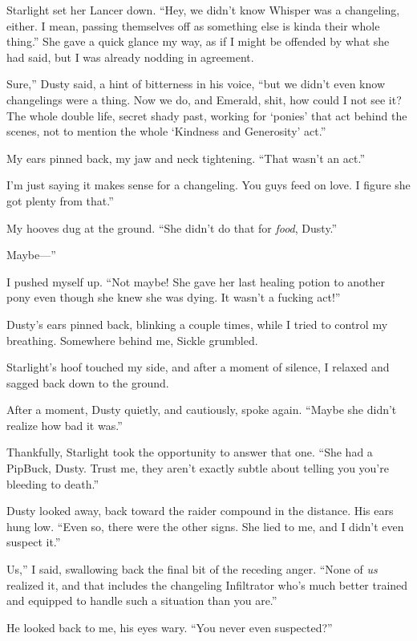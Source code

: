 Starlight set her Lancer down. “Hey, we didn’t know Whisper was a changeling, either. I mean, passing themselves off as something else is kinda their whole thing.” She gave a quick glance my way, as if I might be offended by what she had said, but I was already nodding in agreement.

\leavevmode{}Sure,” Dusty said, a hint of bitterness in his voice, “but we didn’t even know changelings were a thing. Now we do, and Emerald, shit, how could I not see it? The whole double life, secret shady past, working for ‘ponies’ that act behind the scenes, not to mention the whole ‘Kindness and Generosity’ act.”

My ears pinned back, my jaw and neck tightening. “That wasn’t an act.”

\leavevmode{}I’m just saying it makes sense for a changeling. You guys feed on love. I figure she got plenty from that.”

My hooves dug at the ground. “She didn’t do that for \textit{food}, Dusty.”

\leavevmode{}Maybe—”

I pushed myself up. “Not maybe! She gave her last healing potion to another pony even though she knew she was dying. It wasn’t a fucking act!”

Dusty’s ears pinned back, blinking a couple times, while I tried to control my breathing. Somewhere behind me, Sickle grumbled.

Starlight’s hoof touched my side, and after a moment of silence, I relaxed and sagged back down to the ground.

After a moment, Dusty quietly, and cautiously, spoke again. “Maybe she didn’t realize how bad it was.”

Thankfully, Starlight took the opportunity to answer that one. “She had a PipBuck, Dusty. Trust me, they aren’t exactly subtle about telling you you’re bleeding to death.”

Dusty looked away, back toward the raider compound in the distance. His ears hung low. “Even so, there were the other signs. She lied to me, and I didn’t even suspect it.”

\leavevmode{}Us,” I said, swallowing back the final bit of the receding anger. “None of \textit{us} realized it, and that includes the changeling Infiltrator who’s much better trained and equipped to handle such a situation than you are.”

He looked back to me, his eyes wary. “You never even suspected?”

